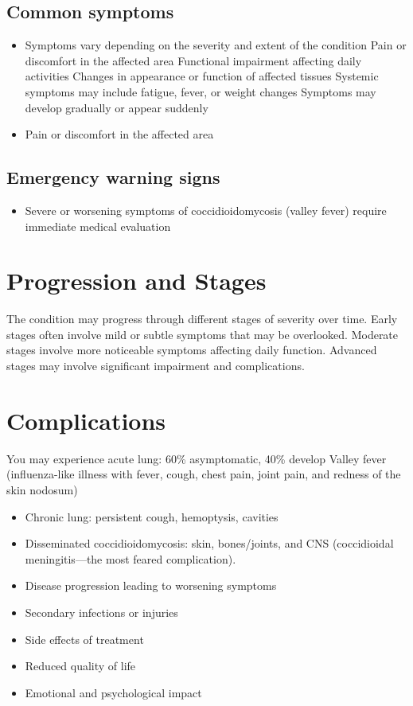 \subsection{Common symptoms}
\begin{itemize}[noitemsep]
  \item Symptoms vary depending on the severity and extent of the condition Pain or discomfort in the affected area Functional impairment affecting daily activities Changes in appearance or function of affected tissues Systemic symptoms may include fatigue, fever, or weight changes Symptoms may develop gradually or appear suddenly
  \item Pain or discomfort in the affected area
  \end{itemize}

\subsection{Emergency warning signs}
\begin{itemize}[noitemsep]
  \item Severe or worsening symptoms of coccidioidomycosis (valley fever) require immediate medical evaluation
\end{itemize}
\section{Progression and Stages}
The condition may progress through different stages of severity over time. Early stages often involve mild or subtle symptoms that may be overlooked. Moderate stages involve more noticeable symptoms affecting daily function. Advanced stages may involve significant impairment and complications.
\section{Complications}
You may experience acute lung: 60\% asymptomatic, 40\% develop Valley fever (influenza-like illness with fever, cough, chest pain, joint pain, and redness of the skin nodosum)

\begin{itemize}[noitemsep]
  \item Chronic lung: persistent cough, hemoptysis, cavities
  \item Disseminated coccidioidomycosis: skin, bones/joints, and CNS (coccidioidal meningitis---the most feared complication).
  \item Disease progression leading to worsening symptoms
  \item Secondary infections or injuries
  \item Side effects of treatment
  \item Reduced quality of life
  \item Emotional and psychological impact
\end{itemize}
